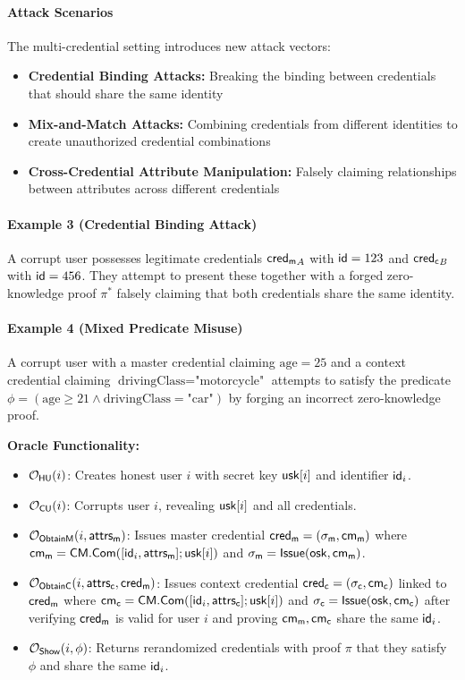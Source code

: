 \paragraph{Attack Scenarios}
The multi-credential setting introduces new attack vectors:
\begin{itemize}
    \item \textbf{Credential Binding Attacks:} Breaking the binding between credentials that should share the same identity
    \item \textbf{Mix-and-Match Attacks:} Combining credentials from different identities to create unauthorized credential combinations
    \item \textbf{Cross-Credential Attribute Manipulation:} Falsely claiming relationships between attributes across different credentials
\end{itemize}

\paragraph{Example 3 (Credential Binding Attack)} A corrupt user possesses legitimate credentials $\mathsf{cred_m}_A$ with $\mathsf{id}=123$ and $\mathsf{cred_c}_B$ with $\mathsf{id}=456$. They attempt to present these together with a forged zero-knowledge proof $\pi^*$ falsely claiming that both credentials share the same identity.

\paragraph{Example 4 (Mixed Predicate Misuse)} A corrupt user with a master credential claiming $\text{age}=25$ and a context credential claiming $\text{drivingClass}=\text{"motorcycle"}$ attempts to satisfy the predicate $\phi=(\text{age} \geq 21 \land \text{drivingClass} = \text{"car"})$ by forging an incorrect zero-knowledge proof.

\noindent \textbf{Oracle Functionality:}
\begin{itemize}
    \item $\mathcal{O}_{\mathsf{HU}}(i)$: Creates honest user $i$ with secret key $\mathsf{usk}[i]$ and identifier $\mathsf{id}_i$.
    
    \item $\mathcal{O}_{\mathsf{CU}}(i)$: Corrupts user $i$, revealing $\mathsf{usk}[i]$ and all credentials.
    
    \item $\mathcal{O}_{\mathsf{ObtainM}}(i, \mathsf{attrs_m})$: Issues master credential $\mathsf{cred_m} = (\sigma_{\mathsf{m}}, \mathsf{cm_m})$ where $\mathsf{cm_m} = \mathsf{CM.Com}([\mathsf{id}_i, \mathsf{attrs_m}]; \mathsf{usk}[i])$ and $\sigma_{\mathsf{m}} = \mathsf{Issue}(\mathsf{osk}, \mathsf{cm_m})$.
    
    \item $\mathcal{O}_{\mathsf{ObtainC}}(i, \mathsf{attrs_c}, \mathsf{cred_m})$: Issues context credential $\mathsf{cred_c} = (\sigma_{\mathsf{c}}, \mathsf{cm_c})$ linked to $\mathsf{cred_m}$ where $\mathsf{cm_c} = \mathsf{CM.Com}([\mathsf{id}_i, \mathsf{attrs_c}]; \mathsf{usk}[i])$ and $\sigma_{\mathsf{c}} = \mathsf{Issue}(\mathsf{osk}, \mathsf{cm_c})$ after verifying $\mathsf{cred_m}$ is valid for user $i$ and proving $\mathsf{cm_m}, \mathsf{cm_c}$ share the same $\mathsf{id}_i$.
    
    \item $\mathcal{O}_{\mathsf{Show}}(i, \phi)$: Returns rerandomized credentials with proof $\pi$ that they satisfy $\phi$ and share the same $\mathsf{id}_i$.
\end{itemize}

